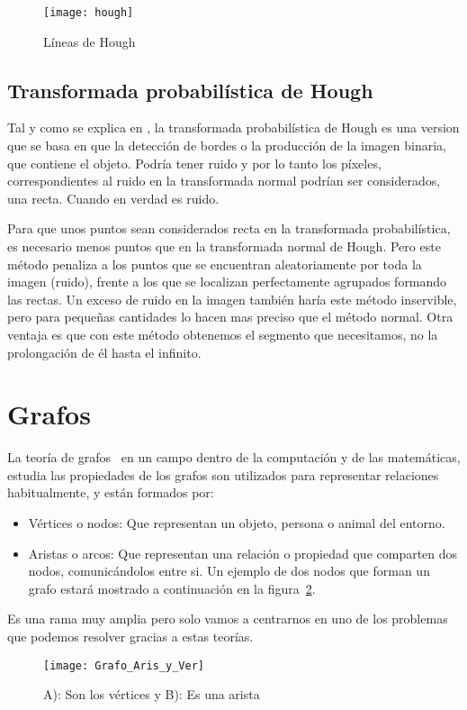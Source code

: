 \begin{figure}[h]
\centering
\texttt{[image: hough]}
\caption{Líneas de Hough~\cite{opencv:HoughIm}}
\label{fig:3.5}
\end{figure}
\subsection{Transformada probabilística de Hough}

Tal y como se explica en \cite{Kiryati20001157}, la transformada probabilística de Hough es una version que se basa en que la detección de bordes o la producción de la imagen binaria, que contiene el objeto. Podría tener ruido y por lo tanto los píxeles, correspondientes al ruido en la transformada normal podrían ser considerados, una recta. Cuando en verdad es ruido.

Para que unos puntos sean considerados recta en la transformada probabilística, es necesario menos puntos que en la transformada normal de Hough.
Pero este método penaliza a los puntos que se encuentran aleatoriamente por toda la imagen (ruido), frente a los que se localizan perfectamente agrupados formando las rectas. 
Un exceso de ruido en la imagen también haría este método inservible, pero para pequeñas cantidades lo hacen mas preciso que el método normal.
Otra ventaja es que con este método obtenemos el segmento que necesitamos, no la prolongación de él hasta el infinito.



\section{Grafos}	
La teoría de grafos~\cite{Wiki:Grafos} en un campo dentro de la computación y de las matemáticas, estudia las propiedades de los grafos son utilizados para representar relaciones habitualmente, y están formados por:
\begin{itemize}
	\item Vértices o nodos: Que representan un objeto, persona o animal del entorno.
	\item Aristas o arcos: Que representan una relación o propiedad que comparten dos nodos, comunicándolos entre si.
Un ejemplo de dos nodos que forman un grafo estará mostrado a continuación en la figura~\ref{fig:3.7}.
\end{itemize}

Es una rama muy amplia pero solo vamos a centrarnos en uno de los problemas que podemos resolver gracias a estas teorías.
\begin{figure}[h]
\centering
\texttt{[image: Grafo\_Aris\_y\_Ver]}
\caption{A): Son los vértices y B): Es una arista}
\label{fig:3.7}
\end{figure}

